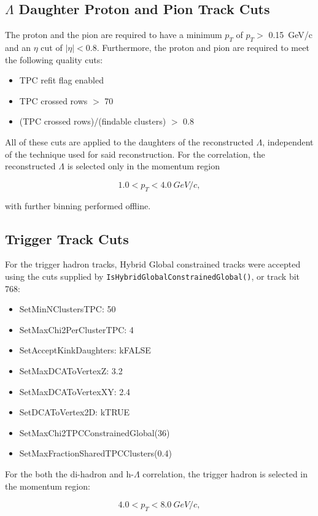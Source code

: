 \documentclass[ALICE,manyauthors]{ALICE_analysis_notes}
\begin{document}
\subsection{$\Lambda$ Daughter Proton and Pion Track Cuts}
\label{daughtercuts}
The proton and the pion are required to have a minimum $p_{T}$ of $p_{T} >$ \SI{0.15}{GeV/c} and an $\eta$ cut of $|{\eta}| < 0.8$. Furthermore, the proton and pion are required to meet the following quality cuts:
\begin{itemize}
	\item TPC refit flag enabled
	\item TPC crossed rows $>$ 70
	\item (TPC crossed rows)/(findable clusters) $>$ 0.8
\end{itemize}
All of these cuts are applied to the daughters of the reconstructed $\Lambda$, independent of the technique used for said reconstruction. For the correlation, the reconstructed $\Lambda$ is selected only in the momentum region

$${1.0 < p_{T} < \SI{4.0}{GeV/c}},$$

with further binning performed offline.

\subsection{Trigger Track Cuts}
\label{trigcuts}
For the trigger hadron tracks, Hybrid Global constrained tracks were accepted using the cuts supplied by \texttt{IsHybridGlobalConstrainedGlobal()}, or track bit 768:

\begin{itemize}
	\item SetMinNClustersTPC: 50
	\item SetMaxChi2PerClusterTPC: 4
	\item SetAcceptKinkDaughters: kFALSE
	\item SetMaxDCAToVertexZ: 3.2
	\item SetMaxDCAToVertexXY: 2.4
	\item SetDCAToVertex2D: kTRUE
	\item SetMaxChi2TPCConstrainedGlobal(36)
	\item SetMaxFractionSharedTPCClusters(0.4)
\end{itemize}

For the both the di-hadron and h-$\Lambda$ correlation, the trigger hadron is selected in the momentum region:

$${4.0 < p_{T} < \SI{8.0}{GeV/c}},$$
\end{document}
